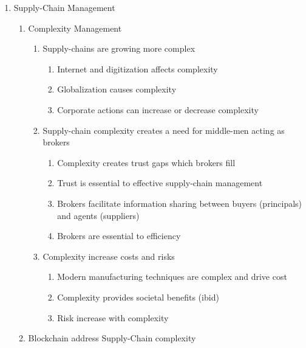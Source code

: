 \documentclass[man]{apa7}
\begin{document}
\begin{enumerate}
\item Supply-Chain Management
\begin{enumerate}
\item Complexity Management
\begin{enumerate}
\item Supply-chains are growing more complex
\begin{enumerate}
\item Internet and digitization affects complexity \parencite{freundEffectInternetInternational2004,bojnecImpactInternetManufacturing2009}
\item Globalization causes complexity  \parencite{fujitaGlobalizationEvolutonSupply2006,serdarasanReviewSupplyChain2013}
\item Corporate actions can increase or decrease complexity \parencite{linawatiSupplyChainFlexibility2017,piyaSupplyChainComplexity2017}
\end{enumerate}
\item Supply-chain complexity creates a need for middle-men acting as brokers
\begin{enumerate}
\item Complexity creates trust gaps which brokers fill \parencite{tangpongReviewBuyersupplierRelationship2015}
\item Trust is essential to effective supply-chain management \parencite{dubeySwiftTrustCommitment2019}
\item Brokers facilitate information sharing between buyers (principals) and agents (suppliers) \parencite{voigtSupplyChainCoordination2012}
\item Brokers are essential to efficiency \parencite{aryaMiddlemanPanaceaSupply2015}
\end{enumerate}
\item Complexity increase costs and risks
\begin{enumerate}
\item Modern manufacturing techniques are complex and drive cost \parencite{thomasCostsBenefitsAdoption2016}
\item Complexity provides societal benefits (ibid)
\item Risk increase with complexity \parencite{wangRiskTransmissionComplex2021,niComprehensiveAssessmentLogistics2019}
\end{enumerate}
\end{enumerate}
\item Blockchain address Supply-Chain complexity

\end{enumerate}
\end{enumerate}
\end{document}
